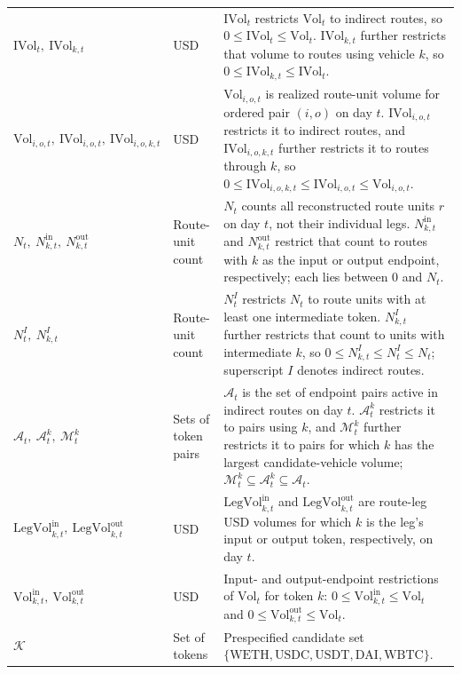 \begin{tabularx}{\linewidth}{@{}>{\raggedright\arraybackslash}Xl>{\raggedright\arraybackslash}X@{}}
$\mathrm{IVol}_t,\ \mathrm{IVol}_{k,t}$ & USD & $\mathrm{IVol}_t$ restricts $\mathrm{Vol}_t$ to indirect routes, so $0\le\mathrm{IVol}_t\le\mathrm{Vol}_t$. $\mathrm{IVol}_{k,t}$ further restricts that volume to routes using vehicle $k$, so $0\le\mathrm{IVol}_{k,t}\le\mathrm{IVol}_t$. \\
$\mathrm{Vol}_{i,o,t},\ \mathrm{IVol}_{i,o,t},\ \mathrm{IVol}_{i,o,k,t}$ & USD & $\mathrm{Vol}_{i,o,t}$ is realized route-unit volume for ordered pair $(i,o)$ on day $t$. $\mathrm{IVol}_{i,o,t}$ restricts it to indirect routes, and $\mathrm{IVol}_{i,o,k,t}$ further restricts it to routes through $k$, so $0\le\mathrm{IVol}_{i,o,k,t}\le\mathrm{IVol}_{i,o,t}\le\mathrm{Vol}_{i,o,t}$. \\
$N_t,\ N^{\mathrm{in}}_{k,t},\ N^{\mathrm{out}}_{k,t}$ & Route-unit count & $N_t$ counts all reconstructed route units $r$ on day $t$, not their individual legs. $N^{\mathrm{in}}_{k,t}$ and $N^{\mathrm{out}}_{k,t}$ restrict that count to routes with $k$ as the input or output endpoint, respectively; each lies between $0$ and $N_t$. \\
$N^I_t,\ N^I_{k,t}$ & Route-unit count & $N^I_t$ restricts $N_t$ to route units with at least one intermediate token. $N^I_{k,t}$ further restricts that count to units with intermediate $k$, so $0\le N^I_{k,t}\le N^I_t\le N_t$; superscript $I$ denotes indirect routes. \\
$\mathcal A_t,\ \mathcal A^k_t,\ \mathcal M^k_t$ & Sets of token pairs & $\mathcal A_t$ is the set of endpoint pairs active in indirect routes on day $t$. $\mathcal A^k_t$ restricts it to pairs using $k$, and $\mathcal M^k_t$ further restricts it to pairs for which $k$ has the largest candidate-vehicle volume; $\mathcal M^k_t\subseteq\mathcal A^k_t\subseteq\mathcal A_t$. \\
$\mathrm{LegVol}^{\mathrm{in}}_{k,t},\ \mathrm{LegVol}^{\mathrm{out}}_{k,t}$ & USD & $\mathrm{LegVol}^{\mathrm{in}}_{k,t}$ and $\mathrm{LegVol}^{\mathrm{out}}_{k,t}$ are route-leg USD volumes for which $k$ is the leg's input or output token, respectively, on day $t$. \\
$\mathrm{Vol}^{\mathrm{in}}_{k,t},\ \mathrm{Vol}^{\mathrm{out}}_{k,t}$ & USD & Input- and output-endpoint restrictions of $\mathrm{Vol}_t$ for token $k$: $0\le\mathrm{Vol}^{\mathrm{in}}_{k,t}\le\mathrm{Vol}_t$ and $0\le\mathrm{Vol}^{\mathrm{out}}_{k,t}\le\mathrm{Vol}_t$. \\
$\mathcal K$ & Set of tokens & Prespecified candidate set $\{\mathrm{WETH},\mathrm{USDC},\mathrm{USDT},\mathrm{DAI},\mathrm{WBTC}\}$. \\

\end{tabularx}
